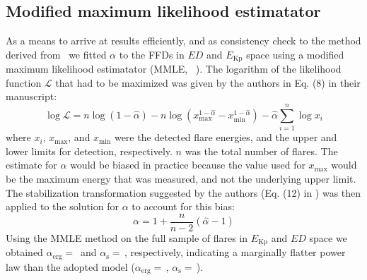 \documentclass{aa}
\begin{document}
\begin{appendix}
\section{Modified maximum likelihood estimatator}
\label{sec:app:MMLE}
As a means to arrive at results efficiently, and as consistency check to the method derived from~\citet{wheatland_flaresbayes_2004} we fitted $\alpha$ to the FFDs in $ED$ and $E_\mathrm{Kp}$ space using a modified maximum likelihood estimatator (MMLE,~ \citealt{maschberger2009}). The logarithm of the likelihood function $\mathcal{L}$ that had to be maximized was given by the authors in Eq. (8) in their manuscript:
\begin{equation}
\log \mathcal{L} = n \log (1-\hat{\alpha})-n \log\left(x_\mathrm{max}^{1-\hat{\alpha}}-x_\mathrm{min}^{1-\hat{\alpha}}\right) - \hat{\alpha} \displaystyle\sum_{i=1}^{n}\log x_i
\label{eqn:MLE}
\end{equation}
where $x_i$, $x_\mathrm{max}$, and $x_\mathrm{min}$ were the detected flare energies, and the upper and lower limits for detection, respectively. $n$ was the total number of flares. The estimate for $\alpha$ would be biased in practice because the value used for $x_\mathrm{max}$ would be the maximum energy that was measured, and not the underlying upper limit. The stabilization transformation suggested by the authors (Eq. (12) in \citealt{maschberger2009}) was then applied to the solution for $\alpha$ to account for this bias:
\begin{equation}
\alpha = 1 + \dfrac{n}{n-2}(\hat{\alpha} - 1)
\label{eqn:MLE_stabilize}
\end{equation}
Using the MMLE method on the full sample of flares in $E_\mathrm{Kp}$ and $ED$ space we obtained $\alpha_\mathrm{erg}=$\, and $\alpha_\mathrm{s}=$\,\unskip, respectively, indicating a marginally flatter power law than the adopted \citet{wheatland_flaresbayes_2004} model ($\alpha_\mathrm{erg}=$\,, $\alpha_\mathrm{s}=$\,).
\end{appendix}
\end{document}
